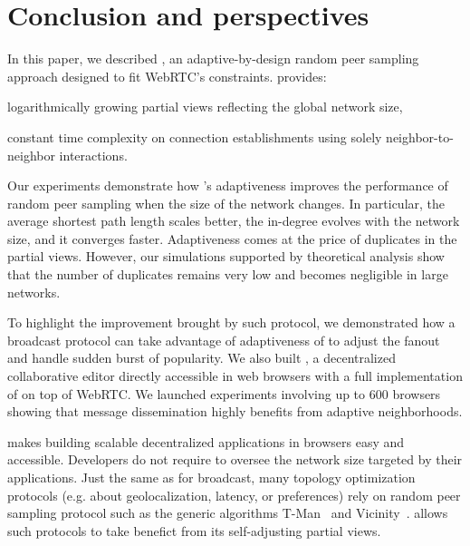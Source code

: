 
\section{Conclusion and perspectives}
\label{sec:conclusion}



In this paper, we described \SPRAY, an adaptive-by-design random peer sampling
approach designed to fit WebRTC's constraints.  \SPRAY provides:
\begin{inparaenum}[(i)]
\item logarithmically growing partial views reflecting the global network size,
\item constant time complexity on connection establishments using solely
  neighbor-to-neighbor interactions.
\end{inparaenum}
Our experiments demonstrate how \SPRAY's adaptiveness improves the performance
of random peer sampling when the size of the network changes. In particular, the
average shortest path length scales better, the in-degree evolves with the
network size, and it converges faster.  Adaptiveness comes at the price of
duplicates in the partial views. However, our simulations supported by
theoretical analysis show that the number of duplicates remains very low and
becomes negligible in large networks.

To highlight the improvement brought by such protocol, we demonstrated
how a broadcast protocol can take advantage of adaptiveness of \SPRAY to
adjust the fanout and handle sudden burst of popularity. We also built
\CRATE, a decentralized collaborative editor directly accessible in
web browsers with a full implementation of \SPRAY on top of WebRTC. We
launched experiments involving up to 600 browsers showing that message
dissemination highly benefits from adaptive neighborhoods.

\SPRAY makes building scalable decentralized applications in browsers
easy and accessible.  Developers do not require to oversee the network
size targeted by their applications. Just the same as for broadcast,
many topology optimization protocols (e.g. about geolocalization,
latency, or preferences) rely on random peer sampling protocol such as
the generic algorithms T-Man~\cite{jelasity2009tman} and
Vicinity~\cite{voulgaris2005epidemic}. \SPRAY allows such protocols to
take benefict from its self-adjusting partial views.


